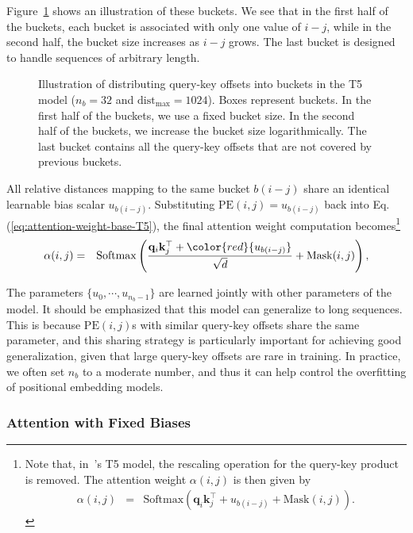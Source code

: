 Figure~\ref{fig:qk-distances-in-buckets-T5} shows an illustration of these buckets. We see that in the first half of the buckets, each bucket is associated with only one value of $i - j$, while in the second half, the bucket size increases as $i - j$ grows. The last bucket is designed to handle sequences of arbitrary length.

\begin{figure}[!t]
\centering

\caption{Illustration of distributing query-key offsets into buckets in the T5 model ($n_b = 32$ and $\mathrm{dist}_{\mathrm{max}}=1024$). Boxes represent buckets. In the first half of the buckets, we use a fixed bucket size. In the second half of the buckets, we increase the bucket size logarithmically. The last bucket contains all the query-key offsets that are not covered by previous buckets.}
\label{fig:qk-distances-in-buckets-T5}
\end{figure}

All relative distances mapping to the same bucket $b(i-j)$ share an identical learnable bias scalar $u_{b(i-j)}$. Substituting $\mathrm{PE}(i,j) = u_{b(i-j)}$ back into Eq. (\ref{eq:attention-weight-base-T5}), the final attention weight computation becomes\footnote{Note that, in~\citet{raffel-etal:2020exploring}'s T5 model, the rescaling operation for the query-key product is removed. The attention weight $\alpha(i,j)$ is then given by
\begin{eqnarray}
\alpha(i,j) & = & \mathrm{Softmax}(\mathbf{q}_i \mathbf{k}_{j}^\top + u_{b(i-j)} + \mathrm{Mask}(i,j)).
\end{eqnarray}
}
\begin{eqnarray}
\alpha(i,j) & = & \mathrm{Softmax}\left( \frac{\mathbf{q}_i \mathbf{k}_{j}^\top + \color{red}{u_{b(i-j)}}}{\sqrt{d}} + \mathrm{Mask}(i,j) \right),
\end{eqnarray}

The parameters $\{u_{0},\cdots,u_{n_b-1}\}$ are learned jointly with other parameters of the model. It should be emphasized that this model can generalize to long sequences. This is because $\mathrm{PE}(i,j)$s with similar query-key offsets share the same parameter, and this sharing strategy is particularly important for achieving good generalization, given that large query-key offsets are rare in training. In practice, we often set $n_b$ to a moderate number, and thus it can help control the overfitting of positional embedding models.

\subsubsection{Attention with Fixed Biases}

